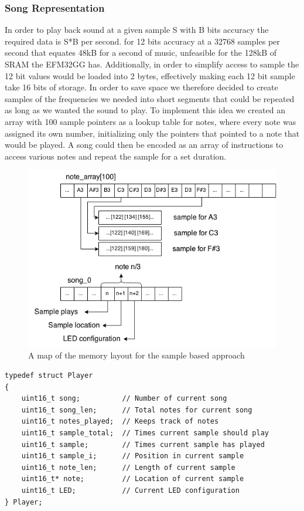 \subsubsection{Song Representation}
In order to play back sound at a given sample S with B bits accuracy the required data is S*B per second. for 12 bits accuracy at a 32768 samples per second that equates 48kB for a second of music, unfeasible for the 128kB of SRAM the EFM32GG has. Additionally, in order to simplify access to sample the 12 bit values would be loaded into 2 bytes, effectively making each 12 bit sample take 16 bits of storage. In order to save space we therefore decided to create samples of the frequencies we needed into short segments that could be repeated as long as we wanted the sound to play. To implement this idea we created an array with 100 sample pointers as a lookup table for notes, where every note was assigned its own number, initializing only the pointers that pointed to a note that would be played. A song could then be encoded as an array of instructions to access various notes and repeat the sample for a set duration.


\begin{figure}[ht]
  \centering
  \includegraphics[width=\textwidth]{images/sample_array_layout.png}
  \caption{A map of the memory layout for the sample based approach}\label{fig:array_layout}
\end{figure}

\noindent\begin{minipage}{\textwidth}
\begin{lstlisting}
typedef struct Player
{
	uint16_t song;			// Number of current song
	uint16_t song_len;		// Total notes for current song
	uint16_t notes_played;	// Keeps track of notes
	uint16_t sample_total;	// Times current sample should play	
	uint16_t sample;		// Times current sample has played
	uint16_t sample_i;		// Position in current sample 
	uint16_t note_len;		// Length of current sample
	uint16_t* note;			// Location of current sample
	uint16_t LED;			// Current LED configuration
} Player;
\end{lstlisting}
\end{minipage}

